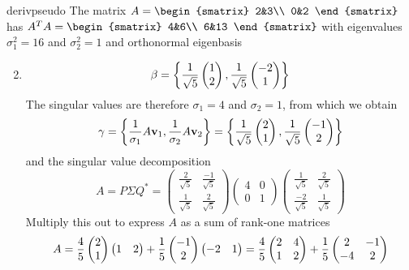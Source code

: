 \begin{examples}{}{derivpseudo}
	\exstart The matrix $A=
	\begin{smatrix}
		2&3\\
		0&2
	\end{smatrix}$ has $A^TA=
	\begin{smatrix}
  	4&6\\
  	6&13
  \end{smatrix}$
  with eigenvalues $\sigma_1^2=16$ and $\sigma_2^2=1$ and orthonormal eigenbasis\vspace{-15pt}
	\begin{enumerate}\setcounter{enumi}{1}
	  \item[]\[
			\beta=\left\{\frac 1{\sqrt 5}\begin{pmatrix}1\\2\end{pmatrix},\frac 1{\sqrt 5}\begin{pmatrix}-2\\1\end{pmatrix}\right\}
		\]
		The singular values are therefore $\sigma_1=4$ and $\sigma_2=1$, from which we obtain
		\[
			\gamma=\left\{\frac 1{\sigma_1}A{\mathbf{v}}_1,\frac 1{\sigma_2}A{\mathbf{v}}_2\right\}
			=\left\{\frac 1{\sqrt 5}\begin{pmatrix}2\\1\end{pmatrix},\frac 1{\sqrt 5}\begin{pmatrix}-1\\2\end{pmatrix}\right\}
		\]
		and the singular value decomposition
		\[
			A=P\Sigma Q^*=
			\begin{pmatrix}
			  \frac 2{\sqrt 5}&\frac{-1}{\sqrt 5}\\
			  \frac 1{\sqrt 5}&\frac 2{\sqrt 5}  
		  \end{pmatrix}
		  \begin{pmatrix}
		  	4&0\\
		  	0&1
		  \end{pmatrix}
		  \begin{pmatrix}
		  	\frac 1{\sqrt 5}&\frac 2{\sqrt 5}\\
		  	\frac{-2}{\sqrt 5}&\frac 1{\sqrt 5}  
		  \end{pmatrix}
		\]
	  Multiply this out to express $A$ as a sum of rank-one matrices
	  \[
	  	A=\frac 45\begin{pmatrix}2\\1\end{pmatrix}
	  	\begin{pmatrix}
	  		1&2
	  	\end{pmatrix}
	  	+
	  	\frac 15\begin{pmatrix}-1\\2\end{pmatrix}
	  	\begin{pmatrix}
	  		-2&1
	  	\end{pmatrix}
	  	=\frac 45
	  	\begin{pmatrix}
			  2&4\\
			  1&2
	  	\end{pmatrix}
	  	+
	  	\frac 15
	  	\begin{pmatrix}
	  		2&-1\\
	  		-4&2
	  	\end{pmatrix}
	  \]
  

\end{enumerate}
\end{examples}
